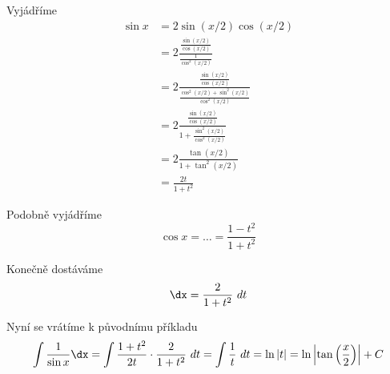 {\begin{itemize}
			Vyjádříme
			\begin{align*}
				\sin x &= 2 \sin(x/2) \cos (x/2) \\
				&= 2 \frac{\frac{\sin(x/2)}{\cos(x/2)}}{\frac{1}{\cos^2(x/2)}} \\
				&= 2 \frac{\frac{\sin(x/2)}{\cos(x/2)}}{\frac{\cos^2(x/2)+\sin^2(x/2)}{\cos^2(x/2)}}\\
				&= 2 \frac{\frac{\sin(x/2)}{\cos(x/2)}}{1+\frac{\sin^2(x/2)}{\cos^2(x/2)}}\\
				&=2 \frac{\tan(x/2)}{1+\tan^2(x/2)} \\
				&= \frac{2t}{1+t^2} 
			\end{align*}

			Podobně vyjádříme
			$$\cos x = \ldots = \frac{1-t^2}{1+t^2}$$

			Konečně dostáváme
			$$\dx = \frac{2}{1+t^2} \ dt$$

			Nyní se vrátíme k původnímu příkladu
			$$\int \frac{1}{\sin x} \dx = \int \frac{1+t^2}{2t} \cdot \frac{2}{1+t^2} \ dt = \int \frac{1}{t} \ dt 
			=\ln |t| = \ln \left| \tan \left(\frac{x}{2}\right)\right| +C$$

	\end{itemize}
}

